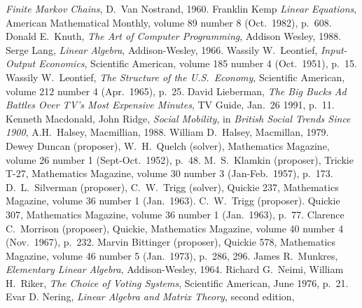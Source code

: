 \begin{thebibliography}{\makebox[2em][c]{{}\hfil{}}}
  \emph{Finite Markov Chains},
  D.~Van Nostrand, 1960.
  Franklin Kemp
  \emph{Linear Equations},
  American Mathematical Monthly,
  volume 89 number 8 (Oct.\ 1982),
  p.~608.
  Donald E.~Knuth,
  \emph{The Art of Computer Programming},
  Addison Wesley,
  1988.     
  Serge Lang,
  \emph{Linear Algebra},
  Addison-Wesley,
  1966.
  Wassily W.\ Leontief,
  \emph{Input-Output Economics},
  Scientific American,
  volume 185 number 4 (Oct.\ 1951),
  p.~15. 
  Wassily W.\ Leontief,
  \emph{The Structure of the U.S.\ Economy},
  Scientific American,
  volume 212 number 4 (Apr.\ 1965),
  p.~25. 
  David Lieberman,
  \emph{The Big Bucks Ad Battles Over TV's Most Expensive Minutes},
  TV Guide,
  Jan.\ 26 1991,
  p.~11.
  Kenneth Macdonald, John Ridge,
  \emph{Social Mobility},
  in \emph{British Social Trends Since 1900},
  A.H.~Halsey,
  Macmillian, 1988.
  William D.~Halsey,
  Macmillan, 1979.
  Dewey Duncan (proposer), W.\ H.\ Quelch (solver),
  Mathematics Magazine,
  volume 26 number 1 (Sept-Oct.\ 1952),
  p.~48.
  M.\ S.\ Klamkin (proposer),
  Trickie T-27,
  Mathematics Magazine,
  volume 30 number 3 (Jan-Feb.\ 1957),
  p.~173.
  D.\ L.\ Silverman (proposer), C.\ W.\ Trigg (solver),
  Quickie 237,
  Mathematics Magazine,
  volume 36 number 1 (Jan.\ 1963).
  C.\ W.\ Trigg (proposer).
  Quickie 307,
  Mathematics Magazine,
  volume 36 number 1 (Jan.\ 1963),
  p.~77.
  Clarence C.\ Morrison (proposer),
  Quickie,
  Mathematics Magazine,
  volume 40 number 4 (Nov.\ 1967),
  p.~232.
  Marvin Bittinger (proposer),
  Quickie 578,
  Mathematics Magazine,
  volume 46 number 5 (Jan.\ 1973),
  p.~286, 296.
  James R.\ Munkres,
  \emph{Elementary Linear Algebra},
  Addison-Wesley,
  1964.
  Richard G.~Neimi, William H.~Riker,
  \emph{The Choice of Voting Systems},
  Scientific American,
  June 1976,
  p.~21.
  Evar D. Nering,
  \emph{Linear Algebra and Matrix Theory},
  second edition,

\end{thebibliography}
